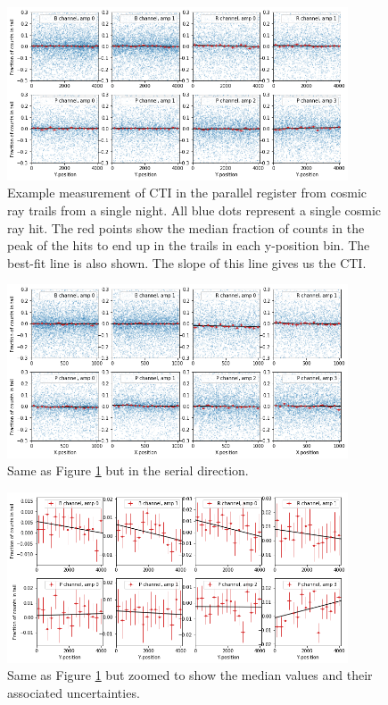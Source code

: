 \begin{figure}
    \centering
    \includegraphics[width=0.9\textwidth]{figures/cte/single_night_example_parallel.png}
    \caption{Example measurement of CTI in the parallel register from cosmic ray trails from a single night. All blue dots represent a single cosmic ray hit. The red points show the median fraction of counts in the peak of the hits to end up in the trails in each y-position bin. The best-fit line is also shown. The slope of this line gives us the CTI.}
    \label{fig:cte_single_night}
\end{figure}

\begin{figure}
    \centering
    \includegraphics[width=0.9\textwidth]{figures/cte/single_night_example_serial.png}
    \caption{Same as Figure \ref{fig:cte_single_night} but in the serial direction.}
    \label{fig:cte_single_night_serial}
\end{figure}

\begin{figure}
    \centering
    \includegraphics[width=0.9\textwidth]{figures/cte/single_night_example_parallel_medians.png}
    \caption{Same as Figure \ref{fig:cte_single_night} but zoomed to show the median values and their associated uncertainties.}
    \label{fig:cte_single_night_medians}
\end{figure}

